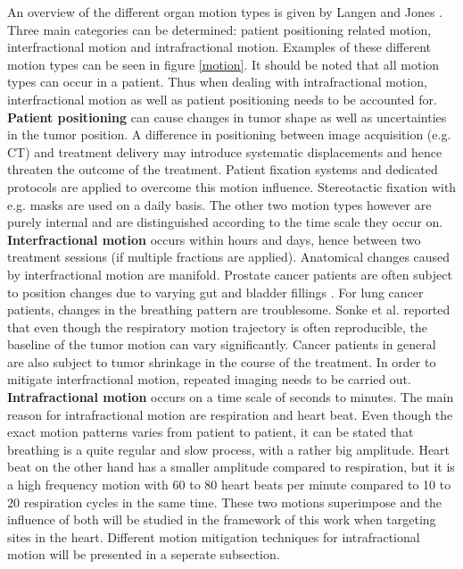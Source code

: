 An overview of the different organ motion types is given by Langen and Jones \cite{Lan01}. Three main categories can be determined: 
patient positioning related motion, interfractional motion and intrafractional motion. Examples of these different motion types can be seen 
in figure \ref{motion}. It should be noted that all motion types can occur in a patient. Thus when dealing with intrafractional motion, 
interfractional motion as well as patient positioning needs to be accounted for.\newline
\newline
\textbf{Patient positioning} can cause changes in tumor shape as well as uncertainties in the tumor position. A difference in positioning 
between image acquisition (e.g. CT) and treatment delivery may introduce systematic displacements and hence threaten the outcome of the 
treatment. Patient fixation systems and dedicated protocols are applied to overcome this motion influence. Stereotactic fixation with e.g. 
masks are used on a daily basis. The other two motion types however are purely internal and are distinguished according to the time scale 
they occur on.\newline
\newpage
\textbf{Interfractional motion} occurs within hours and days, hence between two treatment sessions (if multiple fractions 
are applied). Anatomical changes caused by interfractional motion are manifold. Prostate cancer patients are often subject to position 
changes due to varying gut and bladder fillings \cite{Fok04}. For lung cancer patients, changes in the breathing pattern are troublesome. 
Sonke et al. \cite{Son08} reported that even though the respiratory motion trajectory is often reproducible, the baseline of the tumor 
motion can vary significantly. Cancer patients in general are also subject to tumor shrinkage \cite{Mor09} in the course of the treatment. 
In order to mitigate interfractional motion, repeated imaging needs to be carried out.\newline
\newline
\textbf{Intrafractional motion} occurs on a time scale of seconds to minutes. The main reason for intrafractional motion are respiration 
and heart beat. Even though the exact motion patterns varies from patient to patient, it can be stated that breathing is a quite regular 
and slow process, with a rather big amplitude. Heart beat on the other hand has a smaller amplitude compared to respiration, but it is a 
high frequency motion with 60 to 80 heart beats per minute compared to 10 to 20 respiration cycles in the same time. These two motions 
superimpose and the influence of both will be studied in the framework of this work when targeting sites in the heart. Different motion 
mitigation techniques for intrafractional motion will be presented in a seperate subsection. 

